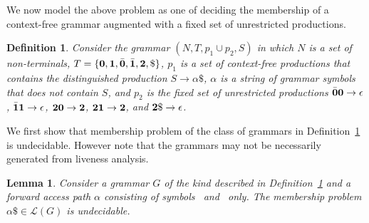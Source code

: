 \documentclass[preprint,9pt]{sigplanconf}
\newtheorem{proposition}[theorem]{Proposition}
\newtheorem{definition}[theorem]{Definition}
\newtheorem{lemma}[theorem]{Lemma}
\begin{document}
We now model  the above problem as one  of deciding the
membership of  a context-free grammar augmented  with a
fixed set of unrestricted productions.

\begin{definition}\label{def:specialgrammar}
Consider the  grammar $(N,T,  p_1\cup p_2,S)$  in which
$N$ is  a set  of non-terminals,  $T =  \{\mathbf{0}, \mathbf{1},
\bar{\mathbf{0}},  \bar{\mathbf{1}},  {\mathbf{2}},  \$\}$,   $p_1$  is  a  set  of
context-free    productions     that    contains    the
distinguished  production   $S  \rightarrow  \alpha\$$,
$\alpha$ is a  string of grammar symbols  that does not
contain $S$, and $p_2$ is the fixed set of unrestricted
productions    $\bar{\mathbf{0}}\mathbf{0}    \rightarrow    \epsilon$,
$\bar{\mathbf{1}}\mathbf{1}    \rightarrow   \epsilon$,    ${\mathbf{2}}\mathbf{0}
\rightarrow {\mathbf{2}}$,  ${\mathbf{2}}\mathbf{1} \rightarrow {\mathbf{2}}$,
and ${\mathbf{2}}\$ \rightarrow \epsilon$.
\end{definition}

We first show that membership problem of the class of grammars in
Definition~\ref{def:specialgrammar} is undecidable. However note that
the grammars may not be necessarily generated from liveness analysis.
\newcommand{\state}{\ensuremath{\mathsf{S}}}
\newcommand{\nont}[2]{\ensuremath{\mathsf{S}_{#1}^{#2}}}  
\begin{lemma}\label{lemma:grammar-undecidable}
Consider a grammar    $G$    of   the    kind    described    in
Definition~\ref{def:specialgrammar}  and a forward access path $\alpha$
consisting  of symbols \acar\  and \acdr\  only. The membership problem
$\alpha\$ \in \mathscr{L}(G)$ is undecidable.
\end{lemma} 
\end{document}
